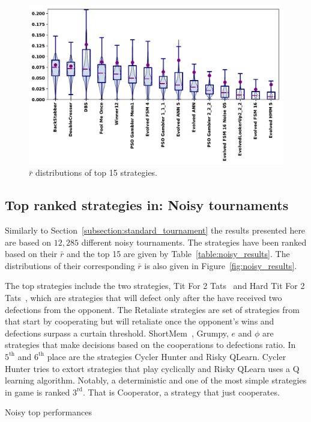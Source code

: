 \documentclass{article}
\begin{document}
\begin{figure}[!htbp]
    \centering
    \includegraphics[width=.7\textwidth]{../images/performance_standard.pdf}
    \caption{$\bar{r}$ distributions of top 15 strategies.}\label{fig:std_results}
\end{figure}

\subsection{Top ranked strategies in: Noisy tournaments}\label{subsection:noisy_tournament}

Similarly to Section~\ref{subsection:standard_tournament} the results presented
here are based on $12,285$ different noisy tournaments. The strategies have been
ranked based on their \(\bar{r}\) and the top 15 are given by
Table~\ref{table:noisy_results}. The distributions of their corresponding
\(\bar{r}\) is also given in Figure~\ref{fig:noisy_results}.

The top strategies include the two strategies, Tit For 2
Tats~\cite{Axelrod1980b} and Hard Tit For 2 Tats~\cite{Stewart2012}, which are
strategies that will defect only after the have received two defections from the
opponent. The Retaliate strategies are set of strategies
from~\cite{axelrodproject} that start by cooperating but will retaliate once the
opponent's wins and defections surpass a curtain threshold.
ShortMem~\cite{Carvalho2013}, Grumpy, $e$ and $\phi$ are strategies that make
decisions based on the cooperations to defections ratio. In $5^{\text{th}}$ and
$6^{\text{th}}$ place are the strategies Cycler Hunter and  Risky QLearn. Cycler
Hunter tries to extort strategies that play cyclically and Risky QLearn uses a Q
learning algorithm. Notably, a deterministic and one of the most simple
strategies in game is ranked $3^{\text{rd}}$. That is Cooperator, a strategy
that just cooperates.

\begin{table}[!htbp]
    \centering
    \resizebox{.25\textwidth}{!}{
    }
    \caption{Noisy top performances}\label{table:noisy_results}
\end{table}
\end{document}
